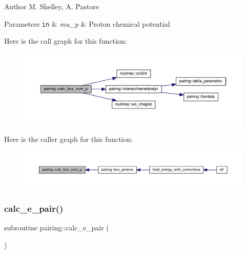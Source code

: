\begin{DoxyAuthor}{Author}
M. Shelley, A. Pastore 
\end{DoxyAuthor}

\begin{DoxyParams}[1]{Parameters}
\mbox{\tt in}  & {\em mu\+\_\+p} & Proton chemical potential \\
\hline
\end{DoxyParams}
Here is the call graph for this function\+:
\nopagebreak
\begin{figure}[H]
\begin{center}
\leavevmode
\includegraphics[width=350pt]{namespacepairing_a37440fb2ff0d8a3495d051f3f14c9107_cgraph}
\end{center}
\end{figure}
Here is the caller graph for this function\+:
\nopagebreak
\begin{figure}[H]
\begin{center}
\leavevmode
\includegraphics[width=350pt]{namespacepairing_a37440fb2ff0d8a3495d051f3f14c9107_icgraph}
\end{center}
\end{figure}
\mbox{\label{namespacepairing_ac34989a934af1e6a63131c619426c5aa}} 
\subsubsection{\texorpdfstring{calc\+\_\+e\+\_\+pair()}{calc\_e\_pair()}}
{\footnotesize\ttfamily subroutine pairing\+::calc\+\_\+e\+\_\+pair (\begin{DoxyParamCaption}{ }\end{DoxyParamCaption})}



